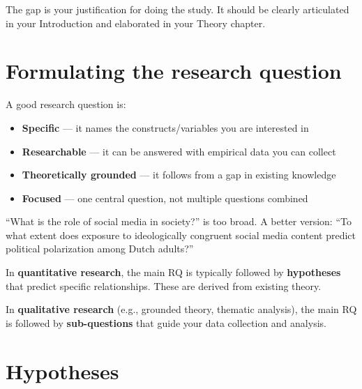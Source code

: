 \documentclass[
  11pt,
  a4paper,
]{scrbook}
\providecommand{\tightlist}{%
  \setlength{\itemsep}{0pt}\setlength{\parskip}{0pt}}\usepackage{longtable,booktabs,array}
\begin{document}
The gap is your justification for doing the study. It should be clearly
articulated in your Introduction and elaborated in your Theory chapter.

\section{Formulating the research
question}\label{formulating-the-research-question}

A good research question is:

\begin{itemize}
\tightlist
\item
  \textbf{Specific} --- it names the constructs/variables you are
  interested in
\item
  \textbf{Researchable} --- it can be answered with empirical data you
  can collect
\item
  \textbf{Theoretically grounded} --- it follows from a gap in existing
  knowledge
\item
  \textbf{Focused} --- one central question, not multiple questions
  combined
\end{itemize}

\begin{tcolorbox}[enhanced jigsaw, bottomrule=.15mm, opacityback=0, toprule=.15mm, colframe=quarto-callout-tip-color-frame, left=2mm, rightrule=.15mm, title=\textcolor{quarto-callout-tip-color}{\faLightbulb}\hspace{0.5em}{Common mistake: too broad}, colbacktitle=quarto-callout-tip-color!10!white, bottomtitle=1mm, colback=white, breakable, toptitle=1mm, titlerule=0mm, leftrule=.75mm, arc=.35mm, opacitybacktitle=0.6, coltitle=black]

``What is the role of social media in society?'' is too broad. A better
version: ``To what extent does exposure to ideologically congruent
social media content predict political polarization among Dutch
adults?''

\end{tcolorbox}

In \textbf{quantitative research}, the main RQ is typically followed by
\textbf{hypotheses} that predict specific relationships. These are
derived from existing theory.

In \textbf{qualitative research} (e.g., grounded theory, thematic
analysis), the main RQ is followed by \textbf{sub-questions} that guide
your data collection and analysis.

\section{Hypotheses}\label{hypotheses}
\end{document}
